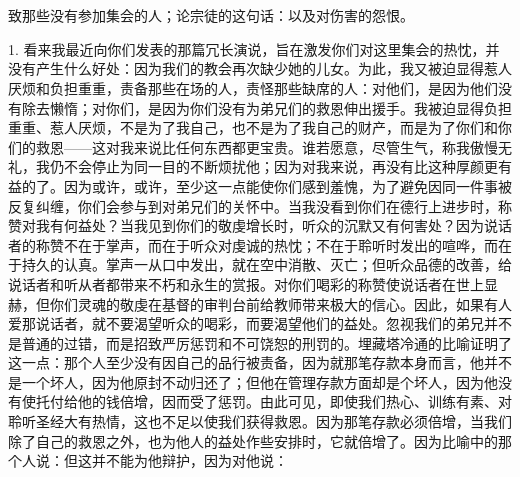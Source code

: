 
\chapter{}


\par

致那些没有参加集会的人；论宗徒的这句话：以及对伤害的怨恨。\par

1. 看来我最近向你们发表的那篇冗长演说，旨在激发你们对这里集会的热忱，并没有产生什么好处：因为我们的教会再次缺少她的儿女。为此，我又被迫显得惹人厌烦和负担重重，责备那些在场的人，责怪那些缺席的人：对他们，是因为他们没有除去懒惰；对你们，是因为你们没有为弟兄们的救恩伸出援手。我被迫显得负担重重、惹人厌烦，不是为了我自己，也不是为了我自己的财产，而是为了你们和你们的救恩——这对我来说比任何东西都更宝贵。谁若愿意，尽管生气，称我傲慢无礼，我仍不会停止为同一目的不断烦扰他；因为对我来说，再没有比这种厚颜更有益的了。因为或许，或许，至少这一点能使你们感到羞愧，为了避免因同一件事被反复纠缠，你们会参与到对弟兄们的关怀中。当我没看到你们在德行上进步时，称赞对我有何益处？当我见到你们的敬虔增长时，听众的沉默又有何害处？因为说话者的称赞不在于掌声，而在于听众对虔诚的热忱；不在于聆听时发出的喧哗，而在于持久的认真。掌声一从口中发出，就在空中消散、灭亡；但听众品德的改善，给说话者和听从者都带来不朽和永生的赏报。对你们喝彩的称赞使说话者在世上显赫，但你们灵魂的敬虔在基督的审判台前给教师带来极大的信心。因此，如果有人爱那说话者，就不要渴望听众的喝彩，而要渴望他们的益处。忽视我们的弟兄并不是普通的过错，而是招致严厉惩罚和不可饶恕的刑罚的。埋藏塔冷通的比喻证明了这一点：那个人至少没有因自己的品行被责备，因为就那笔存款本身而言，他并不是一个坏人，因为他原封不动归还了；但他在管理存款方面却是个坏人，因为他没有使托付给他的钱倍增，因而受了惩罚。由此可见，即使我们热心、训练有素、对聆听圣经大有热情，这也不足以使我们获得救恩。因为那笔存款必须倍增，当我们除了自己的救恩之外，也为他人的益处作些安排时，它就倍增了。因为比喻中的那个人说：但这并不能为他辩护，因为对他说： \par

